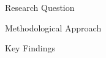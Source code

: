 \begin{frame}

    \begin{block}{Research Question}
        \lipsum[1][1]
    \end{block}
    
    \begin{block}{Methodological Approach} 
        \lipsum[1][2]
    \end{block}
    
    \begin{block}{Key Findings} 
        \lipsum[1][3]
    \end{block}
    
    
\end{frame}


